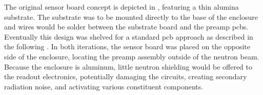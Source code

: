\documentclass[../../../main.tex]{subfiles}%
\begin{document}
    \par%
    The original sensor board concept is depicted in , featuring a thin \gls{alumina} substrate.
    The substrate was to be mounted directly to the base of the enclosure and wires would be solder between the substrate board and the \gls{preamp} \glspl{pcb}.
    Eventually this design was shelved for a standard \gls{pcb} approach as described in the following .
    In both iterations, the sensor board was placed on the opposite side of the enclosure, locating the \gls{preamp} assembly outside of the neutron beam.
    Because the enclosure is aluminum, little neutron shielding would be offered to the readout electronics, potentially damaging the circuits, creating secondary radiation noise, and activating various constituent components.
\end{document}
